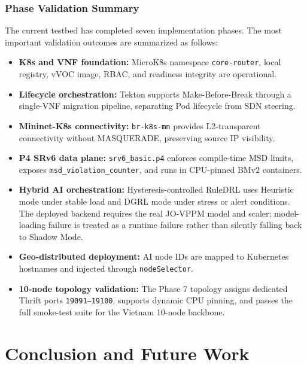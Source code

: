 \documentclass[12pt, a4paper, reqno, oneside]{book}
\begin{document}
\subsection{Phase Validation Summary}
The current testbed has completed seven implementation phases. The most important validation outcomes are summarized as follows:
\begin{itemize}
    \item \textbf{K8s and VNF foundation:} MicroK8s namespace \texttt{core-router}, local registry, vVOC image, RBAC, and readiness integrity are operational.
    \item \textbf{Lifecycle orchestration:} Tekton supports Make-Before-Break through a single-VNF migration pipeline, separating Pod lifecycle from SDN steering.
    \item \textbf{Mininet-K8s connectivity:} \texttt{br-k8s-mn} provides L2-transparent connectivity without MASQUERADE, preserving source IP visibility.
    \item \textbf{P4 SRv6 data plane:} \texttt{srv6\_basic.p4} enforces compile-time MSD limits, exposes \texttt{msd\_violation\_counter}, and runs in CPU-pinned BMv2 containers.
    \item \textbf{Hybrid AI orchestration:} Hysteresis-controlled RuleDRL uses Heuristic mode under stable load and DGRL mode under stress or alert conditions. The deployed backend requires the real JO-VPPM model and scaler; model-loading failure is treated as a runtime failure rather than silently falling back to Shadow Mode.
    \item \textbf{Geo-distributed deployment:} AI node IDs are mapped to Kubernetes hostnames and injected through \texttt{nodeSelector}.
    \item \textbf{10-node topology validation:} The Phase 7 topology assigns dedicated Thrift ports \texttt{19091--19100}, supports dynamic CPU pinning, and passes the full smoke-test suite for the Vietnam 10-node backbone.
\end{itemize}


\chapter{Conclusion and Future Work}
\label{chap:conclusions}
\end{document}
